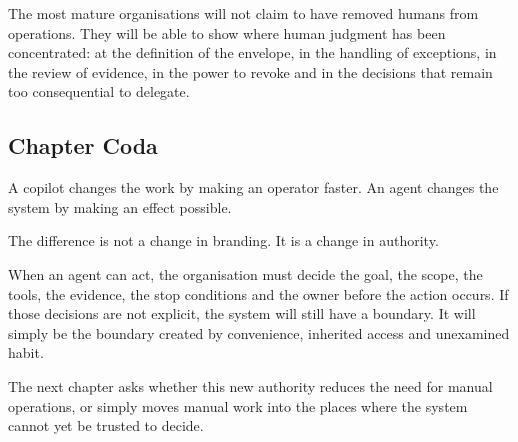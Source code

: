 The most mature organisations will not claim to have removed humans from
operations. They will be able to show where human judgment has been
concentrated: at the definition of the envelope, in the handling of
exceptions, in the review of evidence, in the power to revoke and in the
decisions that remain too consequential to delegate.

\subsection{Chapter Coda}\label{chapter-coda}

A copilot changes the work by making an operator faster. An agent
changes the system by making an effect possible.

The difference is not a change in branding. It is a change in authority.

When an agent can act, the organisation must decide the goal, the scope,
the tools, the evidence, the stop conditions and the owner before the
action occurs. If those decisions are not explicit, the system will
still have a boundary. It will simply be the boundary created by
convenience, inherited access and unexamined habit.

The next chapter asks whether this new authority reduces the need for
manual operations, or simply moves manual work into the places where the
system cannot yet be trusted to decide.
